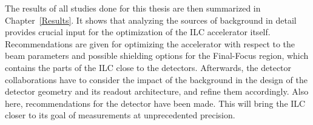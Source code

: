 The results of all studies done for this thesis are then summarized in Chapter~\ref{Results}.
It shows that analyzing the sources of background in detail provides crucial input for the optimization of the ILC accelerator itself.
Recommendations are given for optimizing the accelerator with respect to the beam parameters and possible shielding options for the Final-Focus region, which contains the parts of the ILC close to the detectors.
Afterwards, the detector collaborations have to consider the impact of the background in the design of the detector geometry and its readout architecture, and refine them accordingly.
Also here, recommendations for the \sid detector have been made.
This will bring the ILC closer to its goal of measurements at unprecedented precision.
